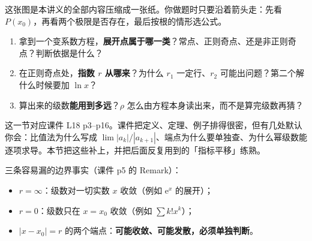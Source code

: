 \documentclass[11pt]{ctexart}
\newcommand{\ee}{\mathrm{e}}
\begin{document}
这张图是本讲义的全部内容压缩成一张纸。你做题时只要沿着箭头走：先看 $P(x_0)$，再看两个极限是否存在，最后按根的情形选公式。


\begin{enumerate}
  \item 拿到一个变系数方程，\textbf{展开点属于哪一类}？常点、正则奇点、还是非正则奇点？判断依据是什么？
  \item 在正则奇点处，\textbf{指数 $r$ 从哪来}？为什么 $r_1$ 一定行、$r_2$ 可能出问题？第二个解什么时候要加 $\ln x$？
  \item 算出来的级数\textbf{能用到多远}？$\rho$ 怎么由方程本身读出来，而不是算完级数再猜？
\end{enumerate}


这一节对应课件 L18 p3--p16。课件把定义、定理、例子排得很密，但有几处默认你会：比值法为什么写成 $\lim|a_k|/|a_{k+1}|$、端点为什么要单独查、为什么幂级数能逐项求导。本节把这些补上，并把后面反复用到的「指标平移」练熟。



三条容易漏的边界事实（课件 p5 的 Remark）：
\begin{itemize}
  \item $r=\infty$：级数对一切实数 $x$ 收敛（例如 $\ee^x$ 的展开）；
  \item $r=0$：级数只在 $x=x_0$ 收敛（例如 $\sum k!x^k$）；
  \item $|x-x_0|=r$ 的两个端点：\textbf{可能收敛、可能发散，必须单独判断}。
\end{itemize}


\end{document}
